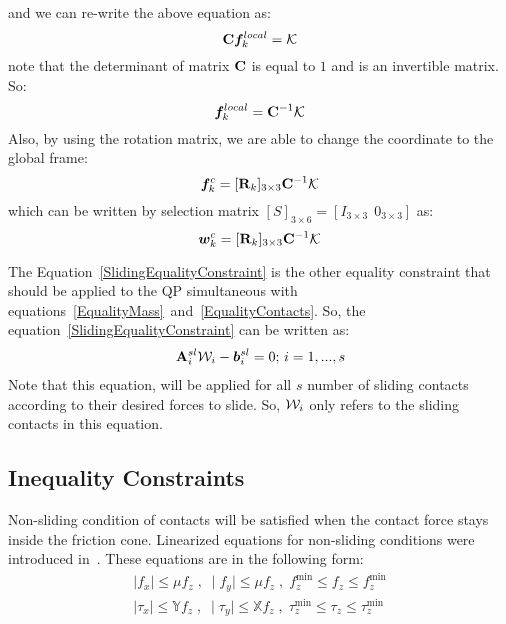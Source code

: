 \documentclass[letterpaper, 10pt, conference]{ieeeconf}
\begin{document}
and we can re-write the above equation as:
\begin{equation}
\bfC\bff^{local}_k = \calK
\end{equation}
note that the determinant of matrix $\mathbf{C}$ is equal to $1$ and is an invertible matrix. So:
\begin{equation}
\bff^{local}_k = \bfC^{-1}\calK
\end{equation}
Also, by using the rotation matrix, we are able to change the coordinate to the global frame:
\begin{equation}
\bff_k^c = [\bfR_k]_{3\times3} \bfC^{-1}\calK
\end{equation}
which can be written by selection matrix $[S]_{3\times6} = [I_{3\times3} \ \ 0_{3\times3}]$ as:
\begin{equation}
[S]\bfw_k^c = [\bfR_k]_{3\times3} \bfC^{-1}\calK \label{SlidingEqualityConstraint}
\end{equation} 

The Equation~\eqref{SlidingEqualityConstraint} is the other equality constraint that should be applied to the QP simultaneous with equations~\eqref{EqualityMass}~and~\eqref{EqualityContacts}. So, the equation~\eqref{SlidingEqualityConstraint} can be written as:
\begin{align}
\bfA_i^{sl} \calW_i - \bfb^{sl}_i = 0 \text{; } i = 1, ... , s
\end{align}
Note that this equation, will be applied for all $s$ number of sliding contacts according to their desired forces to slide. So, $\mathbf{\calW}_i$ only refers to the sliding contacts in this equation.
\subsection{Inequality Constraints} \label{InequalityConstraintsSubsection}
Non-sliding condition of contacts will be satisfied when the contact force stays inside the friction cone. Linearized equations for non-sliding conditions were introduced in~\cite{Caron2015thesis}. These equations are in the following form:
\begin{equation}
\begin{split}
\mid f_x  \mid \leqslant \mu f_z \;,\; \mid f_y \mid \leqslant \mu f_z  \;,\;  f_z^{\min} \leqslant f_z  \leqslant f_z^{\min} \\ 
\mid \tau_x \mid  \leqslant  \mathbb{Y}f_z \;,\;  \mid \tau_y \mid \leqslant  \mathbb{X}f_z  \;,\; \tau_z^{\min} \leqslant \tau_z  \leqslant \tau_z^{\min} 
\end{split}
\label{FrictionCone}
\end{equation}
\end{document}
